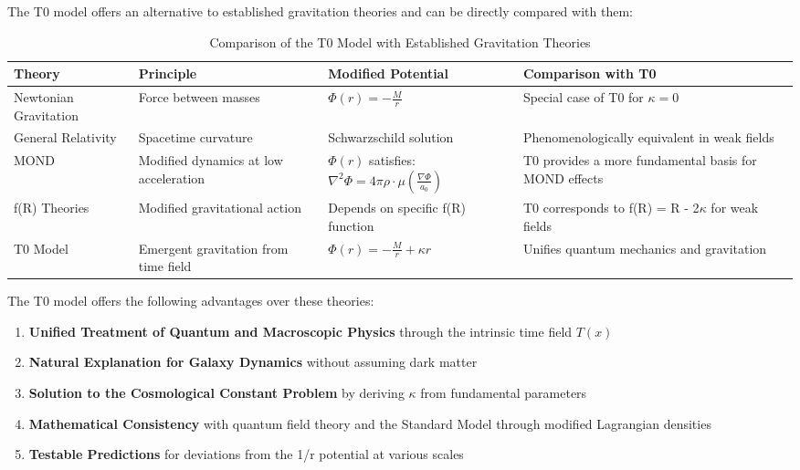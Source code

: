 \documentclass[12pt,a4paper]{article}
\begin{document}
	The T0 model offers an alternative to established gravitation theories and can be directly compared with them:
	
	\begin{table}[H]
		\centering
		
	\begin{tabular}{p{3cm}p{3cm}p{4cm}p{4cm}}
		\toprule
		\textbf{Theory} & \textbf{Principle} & \textbf{Modified Potential} & \textbf{Comparison with T0} \\
		\midrule
		Newtonian Gravitation & Force between masses & $\Phi(r) = -\frac{M}{r}$ & Special case of T0 for $\kappa=0$ \\
		General Relativity & Spacetime curvature & Schwarzschild solution & Phenomenologically equivalent in weak fields \\
		MOND & Modified dynamics at low acceleration & $\Phi(r)$ satisfies: $\nabla^2\Phi = 4\pi \rho\cdot\mu(\frac{\nabla\Phi}{a_0})$ & T0 provides a more fundamental basis for MOND effects \\
		f(R) Theories & Modified gravitational action & Depends on specific f(R) function & T0 corresponds to f(R) = R - 2$\kappa$ for weak fields \\
		T0 Model & Emergent gravitation from time field & $\Phi(r) = -\frac{M}{r} + \kappa r$ & Unifies quantum mechanics and gravitation \\
		\bottomrule
	\end{tabular}

		\caption{Comparison of the T0 Model with Established Gravitation Theories}
		\label{tab:theory_comparison}
	\end{table}
	
	The T0 model offers the following advantages over these theories:
	
	\begin{enumerate}
		\item \textbf{Unified Treatment of Quantum and Macroscopic Physics} through the intrinsic time field $T(x)$
		\item \textbf{Natural Explanation for Galaxy Dynamics} without assuming dark matter
		\item \textbf{Solution to the Cosmological Constant Problem} by deriving $\kappa$ from fundamental parameters
		\item \textbf{Mathematical Consistency} with quantum field theory and the Standard Model through modified Lagrangian densities
		\item \textbf{Testable Predictions} for deviations from the 1/r potential at various scales
	\end{enumerate}
	
\end{document}
